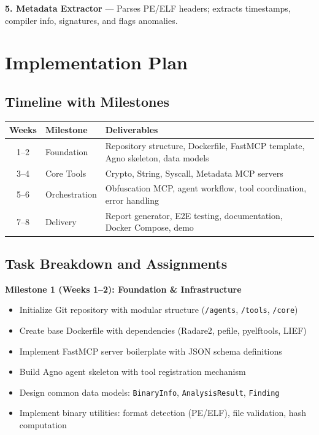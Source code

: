 \documentclass[11pt,a4paper]{article}
\begin{document}
\vspace{0.2cm}
\noindent\textbf{5. Metadata Extractor} — Parses PE/ELF headers; extracts timestamps, compiler info, signatures, and flags anomalies.

\section{Implementation Plan}

\subsection{Timeline with Milestones}

\begin{table}[H]
\centering\small
\begin{tabularx}{\textwidth}{c l X}
\toprule
\textbf{Weeks} & \textbf{Milestone} & \textbf{Deliverables} \\
\midrule
1--2 & Foundation & Repository structure, Dockerfile, FastMCP template, Agno skeleton, data models \\
3--4 & Core Tools & Crypto, String, Syscall, Metadata MCP servers\\
5--6 & Orchestration & Obfuscation MCP, agent workflow, tool coordination, error handling \\
7--8 & Delivery & Report generator, E2E testing, documentation, Docker Compose, demo \\
\bottomrule
\end{tabularx}
\end{table}

\subsection{Task Breakdown and Assignments}

\noindent\textbf{Milestone 1 (Weeks 1--2): Foundation \& Infrastructure}
\begin{itemize}
  \item Initialize Git repository with modular structure (\texttt{/agents}, \texttt{/tools}, \texttt{/core})
  \item Create base Dockerfile with dependencies (Radare2, pefile, pyelftools, LIEF)
  \item Implement FastMCP server boilerplate with JSON schema definitions
  \item Build Agno agent skeleton with tool registration mechanism
  \item Design common data models: \texttt{BinaryInfo}, \texttt{AnalysisResult}, \texttt{Finding}
  \item Implement binary utilities: format detection (PE/ELF), file validation, hash computation
\end{itemize}
\end{document}
